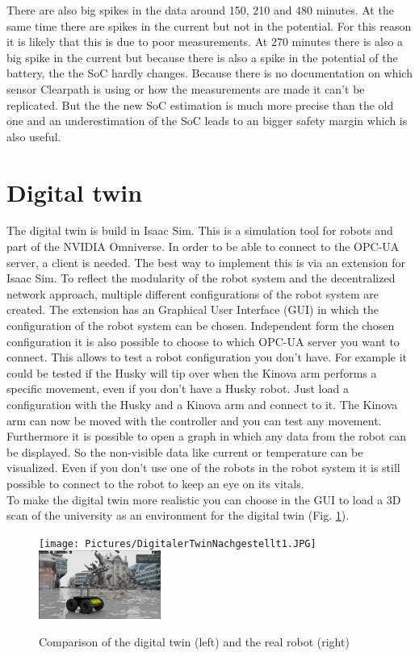 \documentclass[conference]{IEEEtran}
\begin{document}
There are also big spikes in the data around 150, 210 and 480 minutes.
At the same time there are spikes in the current but not in the potential.
For this reason it is likely that this is due to poor measurements.
At 270 minutes there is also a big spike in the current but because there is also a spike in the potential of the battery, the the SoC hardly changes.
Because there is no documentation on which sensor Clearpath is using or how the measurements are made it can't be replicated.
But the the new SoC estimation is much more precise than the old one and an underestimation of the SoC leads to an bigger safety margin which is also useful.
\section{Digital twin}
The digital twin is build in Isaac Sim.
This is a simulation tool for robots and part of the NVIDIA Omniverse.
In order to be able to connect to the OPC-UA server, a client is needed.
The best way to implement this is via an extension for Isaac Sim.
To reflect the modularity of the robot system and the decentralized network approach, multiple different configurations of the robot system are created.
The extension has an Graphical User Interface (GUI) in which the configuration of the robot system can be chosen.
Independent form the chosen configuration it is also possible to choose to which OPC-UA server you want to connect.
This allows to test a robot configuration you don't have. 
For example it could be tested if the Husky will tip over when the Kinova arm performs a specific movement, even if you don't have a Husky robot.
Just load a configuration with the Husky and a Kinova arm and connect to it.
The Kinova arm can now be moved with the controller and you can test any movement.\\
Furthermore it is possible to open a graph in which any data from the robot can be displayed.
So the non-visible data like current or temperature can be visualized.
Even if you don't use one of the robots in the robot system it is still possible to connect to the robot to keep an eye on its vitals.\\
To make the digital twin more realistic you can choose in the GUI to load a 3D scan of the university as an environment for the digital twin (Fig. \ref{fig:CompareDigitalReal}).
\begin{figure}[htbp]
    \centerline{\texttt{[image: Pictures/DigitalerTwinNachgestellt1.JPG]}\includegraphics[width=4cm]{Pictures/DigitalerTwinNachgestellt2.png}}
    \caption{Comparison of the digital twin (left) and the real robot (right)}
    \label{fig:CompareDigitalReal}
\end{figure}
\end{document}
